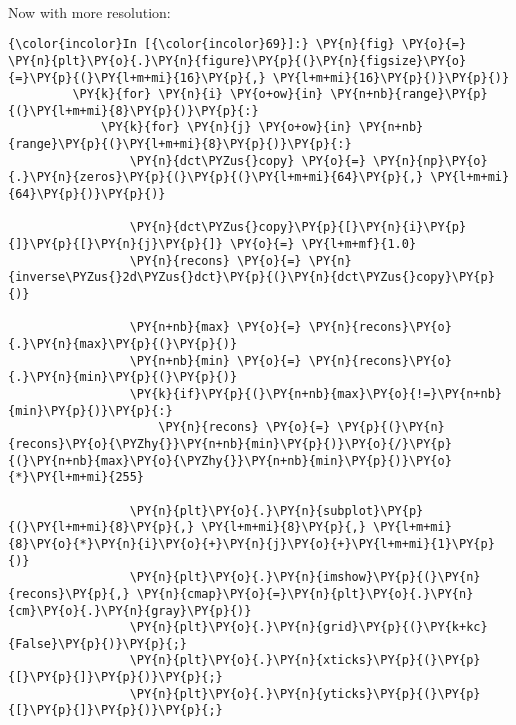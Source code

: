     \begin{center}
    \end{center}
    { \hspace*{\fill} \\}
    
    Now with more resolution:

    \begin{Verbatim}[commandchars=\\\{\}]
{\color{incolor}In [{\color{incolor}69}]:} \PY{n}{fig} \PY{o}{=} \PY{n}{plt}\PY{o}{.}\PY{n}{figure}\PY{p}{(}\PY{n}{figsize}\PY{o}{=}\PY{p}{(}\PY{l+m+mi}{16}\PY{p}{,} \PY{l+m+mi}{16}\PY{p}{)}\PY{p}{)}
         \PY{k}{for} \PY{n}{i} \PY{o+ow}{in} \PY{n+nb}{range}\PY{p}{(}\PY{l+m+mi}{8}\PY{p}{)}\PY{p}{:}
             \PY{k}{for} \PY{n}{j} \PY{o+ow}{in} \PY{n+nb}{range}\PY{p}{(}\PY{l+m+mi}{8}\PY{p}{)}\PY{p}{:}
                 \PY{n}{dct\PYZus{}copy} \PY{o}{=} \PY{n}{np}\PY{o}{.}\PY{n}{zeros}\PY{p}{(}\PY{p}{(}\PY{l+m+mi}{64}\PY{p}{,} \PY{l+m+mi}{64}\PY{p}{)}\PY{p}{)}
         
                 \PY{n}{dct\PYZus{}copy}\PY{p}{[}\PY{n}{i}\PY{p}{]}\PY{p}{[}\PY{n}{j}\PY{p}{]} \PY{o}{=} \PY{l+m+mf}{1.0}
                 \PY{n}{recons} \PY{o}{=} \PY{n}{inverse\PYZus{}2d\PYZus{}dct}\PY{p}{(}\PY{n}{dct\PYZus{}copy}\PY{p}{)}
                 
                 \PY{n+nb}{max} \PY{o}{=} \PY{n}{recons}\PY{o}{.}\PY{n}{max}\PY{p}{(}\PY{p}{)}
                 \PY{n+nb}{min} \PY{o}{=} \PY{n}{recons}\PY{o}{.}\PY{n}{min}\PY{p}{(}\PY{p}{)}
                 \PY{k}{if}\PY{p}{(}\PY{n+nb}{max}\PY{o}{!=}\PY{n+nb}{min}\PY{p}{)}\PY{p}{:}
                     \PY{n}{recons} \PY{o}{=} \PY{p}{(}\PY{n}{recons}\PY{o}{\PYZhy{}}\PY{n+nb}{min}\PY{p}{)}\PY{o}{/}\PY{p}{(}\PY{n+nb}{max}\PY{o}{\PYZhy{}}\PY{n+nb}{min}\PY{p}{)}\PY{o}{*}\PY{l+m+mi}{255}
         
                 \PY{n}{plt}\PY{o}{.}\PY{n}{subplot}\PY{p}{(}\PY{l+m+mi}{8}\PY{p}{,} \PY{l+m+mi}{8}\PY{p}{,} \PY{l+m+mi}{8}\PY{o}{*}\PY{n}{i}\PY{o}{+}\PY{n}{j}\PY{o}{+}\PY{l+m+mi}{1}\PY{p}{)}
                 \PY{n}{plt}\PY{o}{.}\PY{n}{imshow}\PY{p}{(}\PY{n}{recons}\PY{p}{,} \PY{n}{cmap}\PY{o}{=}\PY{n}{plt}\PY{o}{.}\PY{n}{cm}\PY{o}{.}\PY{n}{gray}\PY{p}{)}
                 \PY{n}{plt}\PY{o}{.}\PY{n}{grid}\PY{p}{(}\PY{k+kc}{False}\PY{p}{)}\PY{p}{;}
                 \PY{n}{plt}\PY{o}{.}\PY{n}{xticks}\PY{p}{(}\PY{p}{[}\PY{p}{]}\PY{p}{)}\PY{p}{;}
                 \PY{n}{plt}\PY{o}{.}\PY{n}{yticks}\PY{p}{(}\PY{p}{[}\PY{p}{]}\PY{p}{)}\PY{p}{;}
\end{Verbatim}


